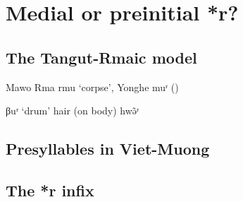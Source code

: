 \documentclass[oldfontcommands,oneside,a4paper,11pt]{article}
\newcommand{\ipa}[1]{{\phon \mbox{#1}}} %
\begin{document}
{\section{Medial or preinitial *r?}

\subsection{The Tangut-Rmaic model}
 
 Mawo Rma \ipa{rmu} `corpse', Yonghe \ipa{muʳ} (\citealt[41]{sims14yonghe})

\ipa{βuʳ} `drum'
hair (on body) \ipa{hwə̃ʳ}
\subsection{Presyllables in Viet-Muong}

\subsection{The *r infix}

 \citet{sagart99roc}

}
\end{document}
